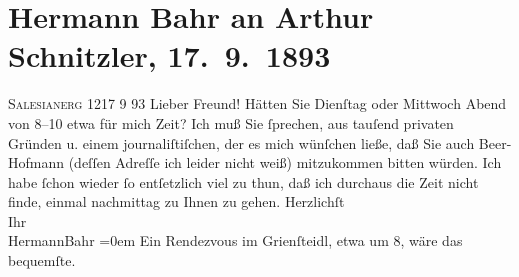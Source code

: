 

         
         \renewcommand{\erwaehntePersonen}{Personen: Hermann Bahr, Richard Beer-Hofmann}
         \renewcommand{\erwaehnteOrte}{Orte: Café Griensteidl, Salesianergasse, Wien}
         \renewcommand{\erwaehnteWerke}{}
               \section[Hermann Bahr an Arthur Schnitzler, 17. 9. 1893]{ Hermann Bahr an Arthur Schnitzler, 17. 9. 1893}\nopagebreak{}\rehead{ }\begin{ledgroupsized}[t]{13cm}\normalsize\beginnumbering{} \toendnotes[C]{\smallbreak\pagebreak[2]} 
\pstart
           \raggedleft{}{\pb}\textsc{Salesianerg 12}17 9 93\pend
           \pstart\center{}Lieber Freund!\pend\pstart
           Hätten Sie Dienſtag oder Mittwoch Abend von 8–10 etwa für mich Zeit? Ich muß Sie
               ſprechen, aus tauſend privaten Gründen u. einem journaliſtiſchen, der es mich
               wünſchen ließe, daß Sie auch Beer-Hofmann
               (deſſen Adreſſe ich leider nicht weiß) {\pb}mitzukommen
               bitten würden. Ich habe ſchon wieder ſo entſetzlich viel zu thun, daß ich durchaus
               die Zeit nicht finde, einmal nachmittag zu Ihnen zu gehen.\pend
           \pstart
           Herzlichſt{\\[\baselineskip]}Ihr{\\[\baselineskip]}\spacefill\mbox{HermannBahr}\pend
           \leftskip=0em{}\pstart
           \noindent{}Ein Rendezvous im Grienſteidl, etwa um 8, wäre
                  das bequemſte.\pend
           
         
         \endnumbering{}\end{ledgroupsized}  \newcommand{\dateiname}{L00263}\newcommand{\titel}{Hermann Bahr an Arthur Schnitzler, 17. 9. 1893}\newcommand{\editorInnen}{ Kurt Ifkovits,  Martin Anton Müller}
      